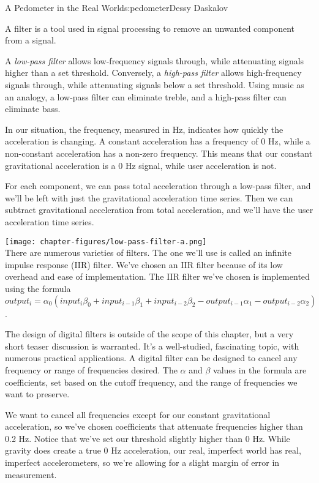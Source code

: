 \begin{aosachapter}{A Pedometer in the Real World}{s:pedometer}{Dessy Daskalov}
\label{low-pass-and-high-pass-filters}

A filter is a tool used in signal processing to remove an unwanted
component from a signal.

A \emph{low-pass filter} allows low-frequency signals through, while
attenuating signals higher than a set threshold. Conversely, a
\emph{high-pass filter} allows high-frequency signals through, while
attenuating signals below a set threshold. Using music as an analogy, a
low-pass filter can eliminate treble, and a high-pass filter can
eliminate bass.

In our situation, the frequency, measured in Hz, indicates how quickly
the acceleration is changing. A constant acceleration has a frequency of
0 Hz, while a non-constant acceleration has a non-zero frequency. This
means that our constant gravitational acceleration is a 0 Hz signal,
while user acceleration is not.

For each component, we can pass total acceleration through a low-pass
filter, and we'll be left with just the gravitational acceleration time
series. Then we can subtract gravitational acceleration from total
acceleration, and we'll have the user acceleration time series.

\texttt{[image: chapter-figures/low-pass-filter-a.png]}\\ There are
numerous varieties of filters. The one we'll use is called an infinite
impulse response (IIR) filter. We've chosen an IIR filter because of its
low overhead and ease of implementation. The IIR filter we've chosen is
implemented using the formula
$output_{i} = \alpha_{0}(input_{i}\beta_{0} + input_{i-1}\beta_{1} + input_{i-2}\beta_{2} - output_{i-1}\alpha_{1} - output_{i-2}\alpha_{2})$.

The design of digital filters is outside of the scope of this chapter,
but a very short teaser discussion is warranted. It's a well-studied,
fascinating topic, with numerous practical applications. A digital
filter can be designed to cancel any frequency or range of frequencies
desired. The $\alpha$ and $\beta$ values in the formula are
coefficients, set based on the cutoff frequency, and the range of
frequencies we want to preserve.

We want to cancel all frequencies except for our constant gravitational
acceleration, so we've chosen coefficients that attenuate frequencies
higher than 0.2 Hz. Notice that we've set our threshold slightly higher
than 0 Hz. While gravity does create a true 0 Hz acceleration, our real,
imperfect world has real, imperfect accelerometers, so we're allowing
for a slight margin of error in measurement.


\end{aosachapter}
